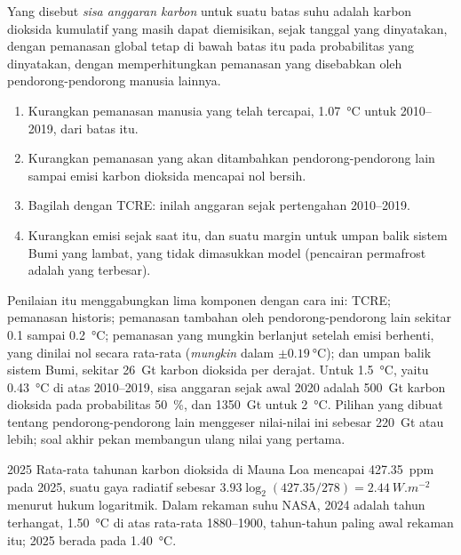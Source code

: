 \begin{definition}\label{def:b2:anthropogenic-climate-change:budget}
Yang disebut \emph{sisa anggaran karbon} untuk suatu batas suhu adalah
karbon dioksida kumulatif yang masih dapat diemisikan, sejak tanggal yang dinyatakan, dengan pemanasan global tetap
di bawah batas itu pada probabilitas yang dinyatakan, dengan memperhitungkan pemanasan yang disebabkan oleh pendorong-pendorong manusia
lainnya.
\end{definition}

\begin{method}\label{met:b2:anthropogenic-climate-change:budget}
\begin{enumerate}
  \item Kurangkan pemanasan manusia yang telah tercapai, \qty{1.07}{\celsius} untuk 2010--2019, dari
        batas itu.
  \item Kurangkan pemanasan yang akan ditambahkan pendorong-pendorong lain sampai emisi karbon dioksida
        mencapai nol bersih.
  \item Bagilah dengan TCRE: inilah anggaran sejak pertengahan 2010--2019.
  \item Kurangkan emisi sejak saat itu, dan suatu margin untuk umpan balik sistem Bumi yang lambat, yang
        tidak dimasukkan model (pencairan permafrost adalah yang terbesar).
\end{enumerate}
\end{method}

Penilaian itu menggabungkan lima komponen dengan cara ini: TCRE; pemanasan historis; pemanasan
tambahan oleh pendorong-pendorong lain sekitar 0.1 sampai \qty{0.2}{\celsius}; pemanasan yang mungkin
berlanjut setelah emisi berhenti, yang dinilai nol secara rata-rata (\emph{mungkin} dalam $\pm
\qty{0.19}{\celsius}$); dan umpan balik sistem Bumi, sekitar \qty{26}{Gt} karbon dioksida per
derajat. Untuk \qty{1.5}{\celsius}, yaitu \qty{0.43}{\celsius} di atas 2010--2019, sisa anggaran sejak
awal 2020 adalah \qty{500}{Gt} karbon dioksida pada probabilitas \qty{50}{\percent}, dan
\qty{1350}{Gt} untuk \qty{2}{\celsius}. Pilihan yang dibuat tentang pendorong-pendorong lain menggeser nilai-nilai ini sebesar
\qty{220}{Gt} atau lebih; soal akhir pekan membangun ulang nilai yang pertama.

\begin{dated}{2025}
Rata-rata tahunan karbon dioksida di Mauna Loa mencapai \qty{427.35}{ppm} pada 2025, suatu gaya radiatif sebesar
$3.93\log_2(427.35/278) = \qty{2.44}{W.m^{-2}}$ menurut hukum logaritmik. Dalam rekaman suhu
NASA, 2024 adalah tahun terhangat, \qty{1.50}{\celsius} di atas rata-rata 1880--1900, tahun-tahun
paling awal rekaman itu; 2025 berada pada \qty{1.40}{\celsius}.
\end{dated}

